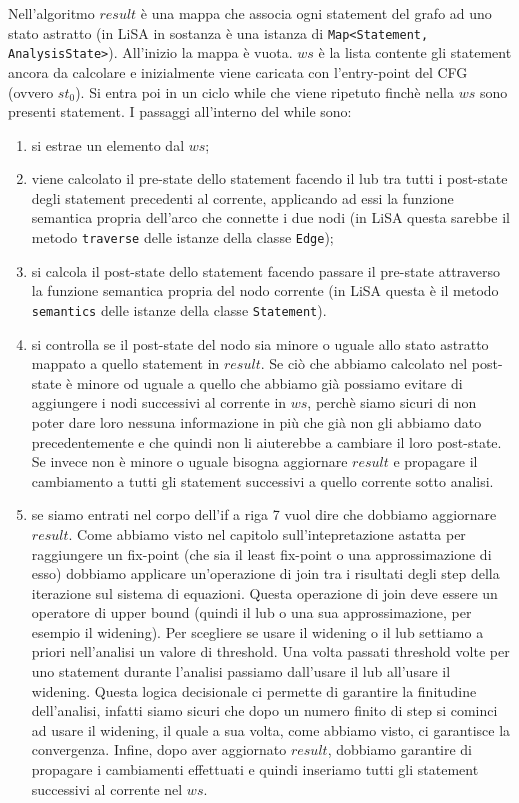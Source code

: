 Nell'algoritmo \(result\) è una mappa che associa ogni statement del grafo ad uno stato astratto (in LiSA in sostanza è una istanza di \texttt{Map<Statement, AnalysisState>}). All'inizio la mappa è vuota. \(ws\) è la lista contente gli statement ancora da calcolare e inizialmente viene caricata con l'entry-point del CFG (ovvero \(st_0\)). Si entra poi in un ciclo while che viene ripetuto finchè nella \(ws\) sono presenti statement. I passaggi all'interno del while sono:
\begin{enumerate}
\itemsep0em 
    \item si estrae un elemento dal \(ws\);
    \item viene calcolato il pre-state dello statement facendo il lub tra tutti i post-state degli statement precedenti al corrente, applicando ad essi la funzione semantica propria dell'arco che connette i due nodi (in LiSA questa sarebbe il metodo \texttt{traverse} delle istanze della classe \texttt{Edge});
    \item si calcola il post-state dello statement facendo passare il pre-state attraverso la funzione semantica propria del nodo corrente (in LiSA questa è il metodo \texttt{semantics} delle istanze della classe \texttt{Statement}).
    \item si controlla se il post-state del nodo sia minore o uguale allo stato astratto mappato a quello statement in \(result\). Se ciò che abbiamo calcolato nel post-state è minore od uguale a quello che abbiamo già possiamo evitare di aggiungere i nodi successivi al corrente in \(ws\), perchè siamo sicuri di non poter dare loro nessuna informazione in più che già non gli abbiamo dato precedentemente e che quindi non li aiuterebbe a cambiare il loro post-state. Se invece non è minore o uguale bisogna aggiornare \(result\) e propagare il cambiamento a tutti gli statement successivi a quello corrente sotto analisi. 
    \item se siamo entrati nel corpo dell'if a riga 7 vuol dire che dobbiamo aggiornare \(result\). Come abbiamo visto nel capitolo sull'intepretazione astatta per raggiungere un fix-point (che sia il least fix-point o una approssimazione di esso) dobbiamo applicare un'operazione di join tra i risultati degli step della iterazione sul sistema di equazioni. Questa operazione di join deve essere un operatore di upper bound (quindi il lub o una sua approssimazione, per esempio il widening). Per scegliere se usare il widening o il lub settiamo a priori nell'analisi un valore di threshold. Una volta passati threshold volte per uno statement durante l'analisi passiamo dall'usare il lub all'usare il widening. Questa logica decisionale ci permette di garantire la finitudine dell'analisi, infatti siamo sicuri che dopo un numero finito di step si cominci ad usare il widening, il quale a sua volta, come abbiamo visto, ci garantisce la convergenza. Infine, dopo aver aggiornato \(result\), dobbiamo garantire di propagare i cambiamenti effettuati e quindi inseriamo tutti gli statement successivi al corrente nel \(ws\). 
\end{enumerate}
